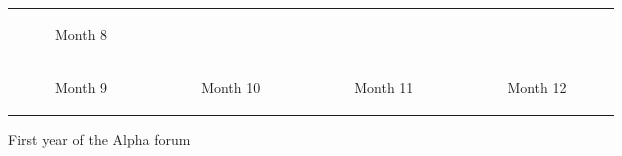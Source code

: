 \begin{minipage}[t]{0.7\textwidth}
\begin{figure}[H]
\begin{adjustbox}{width=\textwidth, keepaspectratio}
\begin{tabular}{cccc}
          \begin{subfigure}[b]{0.24\textwidth}
              \centering
              
              \caption{Month 8}
              \label{fig:month8}
          \end{subfigure} \\
          \begin{subfigure}[b]{0.24\textwidth}
              \centering
              
              \caption{Month 9}
              \label{fig:month9}
          \end{subfigure} &
          \begin{subfigure}[b]{0.24\textwidth}
              \centering
              
              \caption{Month 10}
              \label{fig:month10}
          \end{subfigure} &
          \begin{subfigure}[b]{0.24\textwidth}
              \centering
              
              \caption{Month 11}
              \label{fig:month11}
          \end{subfigure} &
          \begin{subfigure}[b]{0.24\textwidth}
              \centering
              
              \caption{Month 12}
              \label{fig:month12}
          \end{subfigure}
      \end{tabular}
  \end{adjustbox}
  \caption{First year of the Alpha forum}
  \label{fig:monthlyGraphs}
\end{figure}
\end{minipage}
\hfill

